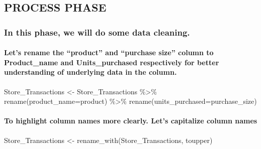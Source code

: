 \documentclass[
]{article}
\newenvironment{Shaded}{\begin{snugshade}}{\end{snugshade}}
\newcommand{\AttributeTok}[1]{\textcolor[rgb]{0.77,0.63,0.00}{#1}}
\newcommand{\FunctionTok}[1]{\textcolor[rgb]{0.00,0.00,0.00}{#1}}
\newcommand{\NormalTok}[1]{#1}
\newcommand{\OtherTok}[1]{\textcolor[rgb]{0.56,0.35,0.01}{#1}}
\newcommand{\SpecialCharTok}[1]{\textcolor[rgb]{0.00,0.00,0.00}{#1}}
\begin{document}
\hypertarget{process-phase}{%
\subsection{PROCESS PHASE}\label{process-phase}}

\hypertarget{in-this-phase-we-will-do-some-data-cleaning.}{%
\subsubsection{In this phase, we will do some data
cleaning.}\label{in-this-phase-we-will-do-some-data-cleaning.}}

\hypertarget{lets-rename-the-product-and-purchase-size-column-to-product_name-and-units_purchased-respectively-for-better-understanding-of-underlying-data-in-the-column.}{%
\paragraph{Let's rename the ``product'' and ``purchase size'' column to
Product\_name and Units\_purchased respectively for better understanding
of underlying data in the
column.}\label{lets-rename-the-product-and-purchase-size-column-to-product_name-and-units_purchased-respectively-for-better-understanding-of-underlying-data-in-the-column.}}

\begin{Shaded}
\begin{Highlighting}[]
\NormalTok{Store\_Transactions }\OtherTok{\textless{}{-}}\NormalTok{ Store\_Transactions }\SpecialCharTok{\%\textgreater{}\%}
  \FunctionTok{rename}\NormalTok{(}\AttributeTok{product\_name=}\NormalTok{product) }\SpecialCharTok{\%\textgreater{}\%}
  \FunctionTok{rename}\NormalTok{(}\AttributeTok{units\_purchased=}\NormalTok{purchase\_size)}
\end{Highlighting}
\end{Shaded}

\hypertarget{to-highlight-column-names-more-clearly.-lets-capitalize-column-names}{%
\paragraph{To highlight column names more clearly. Let's capitalize
column
names}\label{to-highlight-column-names-more-clearly.-lets-capitalize-column-names}}

\begin{Shaded}
\begin{Highlighting}[]
\NormalTok{Store\_Transactions }\OtherTok{\textless{}{-}} \FunctionTok{rename\_with}\NormalTok{(Store\_Transactions, toupper)}
\end{Highlighting}
\end{Shaded}
\end{document}
